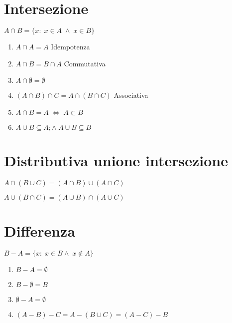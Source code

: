 \section{Intersezione}
$A\cap B=\lbrace x:\;x\in A\;\wedge\; x\in B\rbrace$
\begin{center}
	
\end{center}

\begin{enumerate}
	\item $A\cap A=A$ Idempotenza
	\item $A\cap B=B\cap A$ Commutativa
	\item $A\cap\emptyset=\emptyset$
	\item $\left(A\cap B\right)\cap C=A\cap\left(B\cap C\right)$ Associativa
	\item $A\cap B=A\;\Leftrightarrow\; A\subset B$
	\item $A\cup B\subseteq A;\wedge\;A\cup B\subseteq B$ 
\end{enumerate}
\section{Distributiva unione intersezione}
$A\cap\left(B\cup C\right)=\left(A\cap B\right)\cup\left(A\cap C\right)$

$A\cup\left(B\cap C\right)=\left(A\cup B\right)\cap\left(A\cup C\right)$
\section{Differenza}
$B-A=\lbrace x:\; x\in B\wedge\; x\notin A\rbrace$
\begin{center}
	
\end{center}
\begin{enumerate}
	\item $B-A=\emptyset$
	\item $B-\emptyset=B$
	\item $\emptyset-A=\emptyset$
	\item $\left(A-B\right)-C=A-\left(B\cup C\right)=\left(A-C\right)-B$
\end{enumerate}
